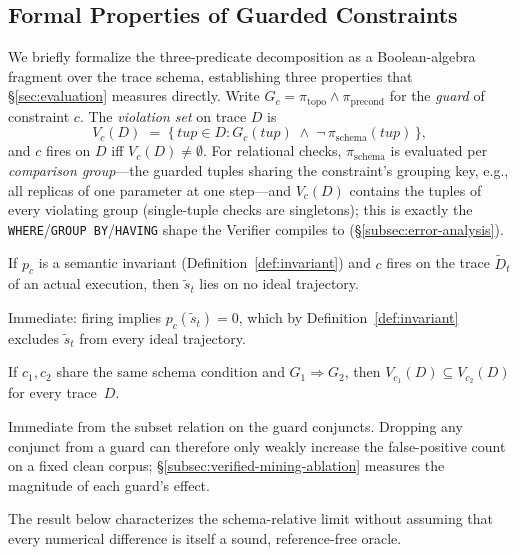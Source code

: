 \documentclass[sigconf,nonacm]{acmart}
\begin{document}
\subsection{Formal Properties of Guarded Constraints}
\label{subsec:theory}

We briefly formalize the three-predicate decomposition as a Boolean-algebra fragment over the trace schema, establishing three properties that \S\ref{sec:evaluation} measures directly. Write $G_c = \pi_{\text{topo}} \wedge \pi_{\text{precond}}$ for the \emph{guard} of constraint $c$. The \emph{violation set} on trace $D$ is
\begin{equation}
\label{eq:violation-set}
V_c(D) \;=\; \bigl\{\, tup \in D : G_c(tup) \;\wedge\; \neg\,\pi_{\text{schema}}(tup)\,\bigr\},
\end{equation}
and $c$ fires on $D$ iff $V_c(D)\neq\emptyset$. For relational checks, $\pi_{\text{schema}}$ is evaluated per \emph{comparison group}---the guarded tuples sharing the constraint's grouping key, e.g., all replicas of one parameter at one step---and $V_c(D)$ contains the tuples of every violating group (single-tuple checks are singletons); this is exactly the \texttt{WHERE}/\texttt{GROUP BY}/\texttt{HAVING} shape the Verifier compiles to (\S\ref{subsec:error-analysis}).

\begin{proposition}[Soundness]\label{prop:soundness}
If $p_c$ is a semantic invariant (Definition~\ref{def:invariant}) and $c$ fires on the trace $\tilde D_t$ of an actual execution, then $\tilde s_t$ lies on no ideal trajectory.
\end{proposition}
\noindent Immediate: firing implies $p_c(\tilde s_t)=0$, which by Definition~\ref{def:invariant} excludes $\tilde s_t$ from every ideal trajectory.

\begin{proposition}\label{prop:monotone}
If $c_1, c_2$ share the same schema condition and $G_1 \Rightarrow G_2$, then $V_{c_1}(D) \subseteq V_{c_2}(D)$ for every trace~$D$.
\end{proposition}
\noindent Immediate from the subset relation on the guard conjuncts. Dropping any conjunct from a guard can therefore only weakly increase the false-positive count on a fixed clean corpus; \S\ref{subsec:verified-mining-ablation} measures the magnitude of each guard's effect.

The result below characterizes the schema-relative limit without assuming
that every numerical difference is itself a sound, reference-free oracle.
\end{document}
